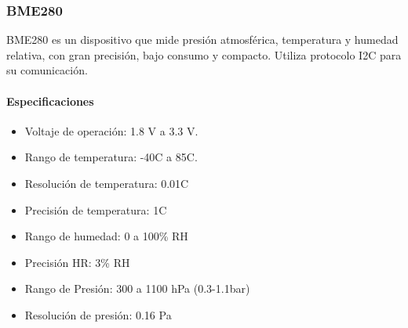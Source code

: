 		

	
	\subsubsection{BME280}
	\begin{tcolorbox}[colback=blue!5!white,colframe=blue!75!black,title=Definición]
		BME280 es un dispositivo que mide presión atmosférica, temperatura y humedad relativa, con gran precisión, bajo consumo y compacto. Utiliza protocolo I2C para su comunicación.\end{tcolorbox}
	
	\paragraph*{Especificaciones}
	\begin{minipage}[t]{.7\textwidth}
		\begin{itemize}
			\item   Voltaje de operación: 1.8 V a 3.3 V.
			\item	Rango de temperatura: -40\grad C a 85\grad C.
			\item   Resolución de temperatura: 0.01\grad C
			\item	Precisión de temperatura: 1\grad C 
			\item	Rango de humedad: 0 a 100\% RH
			\item   Precisión HR: 3\% RH
			\item Rango de Presión: 300 a 1100 hPa (0.3-1.1bar)
			\item Resolución de presión: 0.16 Pa
		\end{itemize}
	\end{minipage}	
	\begin{minipage}[t]{.3\textwidth}
		\centering{}
		\label{fig:BME280}
	\end{minipage}

